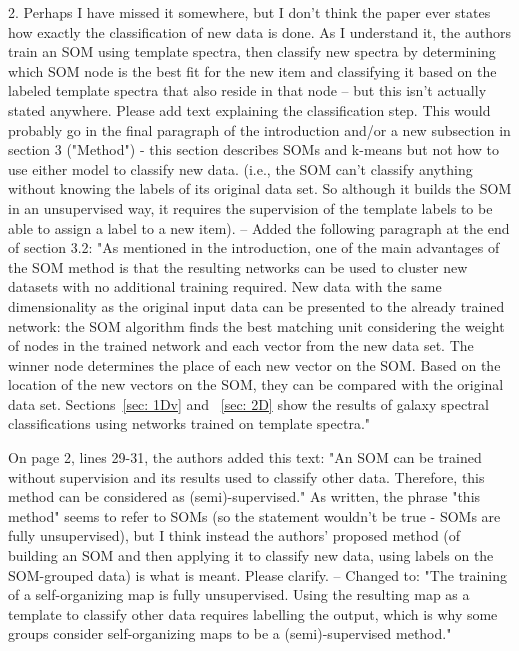 2. Perhaps I have missed it somewhere, but I don't think the paper ever states how exactly the classification of new data is done.  As I understand it, the authors train an SOM using template spectra, then classify new spectra by determining which SOM node is the best fit for the new item and classifying it based on the labeled template spectra that also reside in that node -- but this isn't actually stated anywhere.  Please add text explaining the classification step.  This would probably go in the final paragraph of the introduction and/or a new subsection in section 3 ("Method") - this section describes SOMs and k-means but not how to use either model to classify new data. (i.e., the SOM can't classify anything without knowing the labels of its original data set.  So although it builds the SOM in an unsupervised way, it requires the supervision of the template labels to be able to assign a label to a new item).
-- Added the following paragraph  at the end of section 3.2: %
    "As mentioned in the introduction, one of the main advantages of the SOM method  is that the resulting networks can be used to cluster new datasets with no additional training required. 
     New data with the same dimensionality as the original input data can be presented to the already trained network: the SOM algorithm finds the best matching unit considering the weight of nodes in the trained network and each vector from the new data set.
     The winner node determines the place of each new vector on the SOM.
     Based on the location of the new vectors on the SOM, they can be compared with the original data set. %
     Sections~\ref{sec: 1Dv} and ~\ref{sec: 2D} show the results of galaxy spectral classifications using networks trained on template spectra."

On page 2, lines 29-31, the authors added this text: "An SOM can be trained without supervision and its results used to classify other data. Therefore, this method can be considered as (semi)-supervised." As written, the phrase "this method" seems to refer to SOMs (so the statement wouldn't be true - SOMs are fully unsupervised), but I think instead the authors' proposed method (of building an SOM and then applying it to classify new data, using labels on the SOM-grouped data) is what is meant.  Please clarify.
-- Changed to: %
    "The training of a self-organizing map is fully unsupervised.
     Using the resulting map as a template to classify other data requires labelling the output, which is why some groups consider self-organizing maps to be a (semi)-supervised method."

